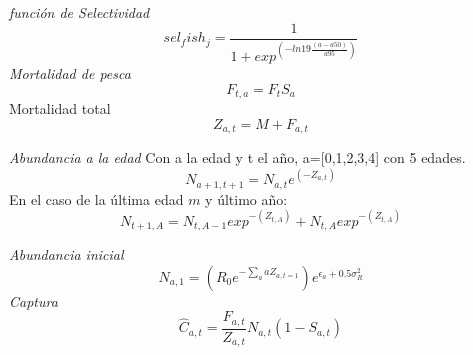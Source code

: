 \documentclass[18pt,]{article}
\begin{document}
\emph{función de Selectividad} \[
sel_fish_j=\frac{1}  {1+exp^{\left({-ln19} {\frac{(a-a50)} {a95}}\right)}}
\] \emph{Mortalidad de pesca} \[
F_{t,a}=F_{t}S_{a}
\] Mortalidad total \[
Z_{a,t}=M+F_{a,t}
\]

\emph{Abundancia a la edad} Con a la edad y t el año, a={[}0,1,2,3,4{]}
con 5 edades. \[
N_{a+1,t+1}=N_{a,t}e^{(-Z_{a,t})}
\] En el caso de la última edad \(m\) y último año: \[
{N_{t+1,A}={N_{t,A-1}}exp^{-(Z_{t,A})} + {N_{t,A}}exp^{-(Z_{t,A})}}
\]

\emph{Abundancia inicial} \[
N_{a,1}=\left(R_{0}e^{-\sum_{a} aZ_{a,t=1}}\right)e^{\epsilon_a+0.5\sigma^2_R} 
\] \emph{Captura} \[
\widehat{C}_{a,t} = {\frac{F_{a,t}} {Z_{a,t}}} N_{a,t}(1-S_{a,t})
\]
\end{document}
